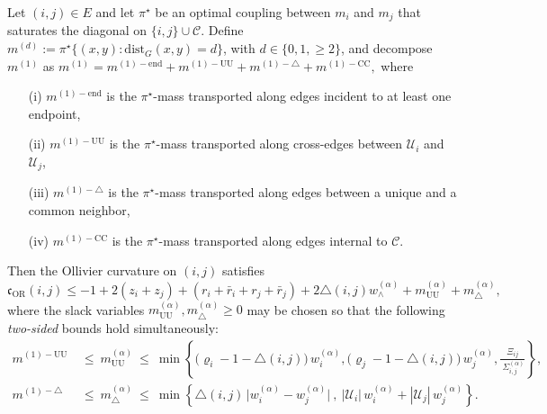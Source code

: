 \documentclass[twoside,11pt]{article}
\numberwithin{equation}{section}
\numberwithin{theorem}{section}
\numberwithin{example}{section}
\begin{document}
\begin{proposition}
\label{prop:lazy-envelope-sharpened}
Let $(i,j)\in E$ and let $\pi^\star$ be an optimal coupling between $m_i$ and $m_j$ that saturates the diagonal on $\{i,j\}\cup\mathcal C$. Define
\(
m^{(d)}:=\pi^\star\{(x,y):\mathrm{dist}_G(x,y)=d\}
\),
with $d\in\{0,1,\ge 2\}$, and decompose $m^{(1)}$ as\newline
\(
m^{(1)}=m^{(1)-\mathrm{end}} + m^{(1)-\mathrm{UU}} + m^{(1)-\triangle} + m^{(1)-\mathrm{CC}},
\)
where 
\begin{itemize}
\item[{\rm (i)}] $m^{(1)-\mathrm{end}}$ is the $\pi^\star$-mass transported along edges incident to at least one endpoint,
\item[{\rm (ii)}] $m^{(1)-\mathrm{UU}}$ is the $\pi^\star$-mass transported along cross-edges between $\mathcal U_i$ and $\mathcal U_j$,
\item[{\rm (iii)}] $m^{(1)-\triangle}$ is the $\pi^\star$-mass transported along edges between a unique and a common neighbor,
\item[{\rm (iv)}] $m^{(1)-\mathrm{CC}}$ is the $\pi^\star$-mass transported along edges internal to $\mathcal C$. 
\end{itemize}
Then the Ollivier curvature on $(i,j)$ satisfies
\begin{equation}
\label{eq:OR-master-corrected-sharp}
\mathfrak c_{\mathrm{OR}}(i,j)
\le
-1+2(z_i+z_j)
+(r_i+\bar r_i+r_j+\bar r_j)
+2\triangle(i,j)w^{(\alpha)}_\wedge
+m^{(\alpha)}_{\mathrm{UU}}
+m^{(\alpha)}_{\triangle},
\end{equation}
where the slack variables $m^{(\alpha)}_{\mathrm{UU}},m^{(\alpha)}_{\triangle}\ge 0$ may be chosen so that the following \emph{two-sided} bounds hold simultaneously:
\begin{align}
\label{eq:mUU-envelope-sharp}
m^{(1)-\mathrm{UU}}
\ &\le\ 
m^{(\alpha)}_{\mathrm{UU}}
\ \le\
\min\!\left\{
\bigl(\varrho_i-1-\triangle(i,j)\bigr)\,w^{(\alpha)}_i,
\bigl(\varrho_j-1-\triangle(i,j)\bigr)\,w^{(\alpha)}_j,
\frac{\Xi_{ij}}{\ \Sigma^{(\alpha)}_{i,j}}
\right\},
\\[4pt]
\label{eq:mTriangle-envelope-sharp}
m^{(1)-\triangle}
\ &\le\ 
m^{(\alpha)}_{\triangle}
\ \le\
\min\!\left\{
\triangle(i,j)\,\bigl|w^{(\alpha)}_i-w^{(\alpha)}_j\bigr|\ ,\ 
|\mathcal U_i|\,w^{(\alpha)}_i+|\mathcal U_j|\,w^{(\alpha)}_j
\right\}.
\end{align}
\end{proposition}
\end{document}
